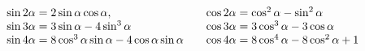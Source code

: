\documentclass{article}
\begin{document}
\[ \begin{array}{@{}r@{\;=\;}l@{\qquad}r@{\;=\;}l@{}}
    \sin2\alpha & 2\sin\alpha\cos\alpha, &
    \cos2\alpha & \cos^2\alpha - \sin^2\alpha\\
    \sin3\alpha & 3\sin\alpha-4\sin^3\alpha &
    \cos3\alpha & 3\cos^3\alpha - 3\cos\alpha\\ 
    \sin4\alpha & 8\cos^3\alpha\sin\alpha - 4\cos\alpha\sin\alpha &
    \cos4\alpha & 8\cos^4\alpha - 8\cos^2\alpha + 1
   \end{array}  \]
\end{document}
